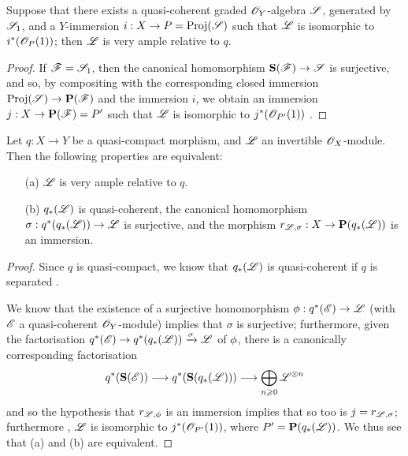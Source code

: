 \begin{corollary}[4.4.3]
\label{II.4.4.3}
Suppose that there exists a quasi-coherent graded $\mathscr{O}_Y$-algebra $\mathscr{S}$, generated by $\mathscr{S}_1$, and a $Y$-immersion $i:X\to P=\Proj(\sh{S})$ such that $\mathscr{L}$ is isomorphic to $i^*(\mathscr{O}_P(1))$;
then $\mathscr{L}$ is very ample relative to $q$.
\end{corollary}

\begin{proof}
If $\mathscr{F}=\mathscr{S}_1$, then the canonical homomorphism $\bb{S}(\sh{F})\to\sh{S}$ is surjective, and so, by compositing with the corresponding closed immersion $\Proj(\sh{S})\to\bb{P}(\sh{F})$  and the immersion $i$, we obtain an immersion $j:X\to\bb{P}(\sh{F})=P'$ such that $\mathscr{L}$ is isomorphic to $j^*(\mathscr{O}_{P'}(1))$ .
\end{proof}

\begin{proposition}[4.4.4]
\label{II.4.4.4}
Let $q:X\to Y$ be a quasi-compact morphism, and $\mathscr{L}$ an invertible $\mathscr{O}_X$-module.
Then the following properties are equivalent:
\begin{enumerate}
  \item[\rm{(a)}] $\mathscr{L}$ is very ample relative to $q$.
  \item[\rm{(b)}] $q_*(\mathscr{L})$ is quasi-coherent, the canonical homomorphism $\sigma:q^*(q_*(\sh{L}))\to\sh{L}$ is surjective, and the morphism $r_{\sh{L},\sigma}:X\to\bb{P}(q_*(\sh{L}))$ is an immersion.
\end{enumerate}
\end{proposition}

\begin{proof}
Since $q$ is quasi-compact, we know that $q_*(\mathscr{L})$ is quasi-coherent if $q$ is separated .

We know  that the existence of a surjective homomorphism $\vphi:q^*(\sh{E})\to\sh{L}$ (with $\mathscr{E}$ a quasi-coherent $\mathscr{O}_Y$-module) implies that $\sigma$ is surjective;
furthermore, given the factorisation $q^*(\sh{E})\to q^*(q_*(\sh{L}))\xrightarrow{\sigma}\sh{L}$ of $\phi$, there is a canonically corresponding factorisation
\[
  q^*(\bb{S}(\sh{E})) \to q^*(\bb{S}(q_*(\sh{L}))) \to \bigoplus_{n\geq0}\sh{L}^{\otimes n}
\]
and so  the hypothesis that $r_{\mathscr{L},\phi}$ is an immersion implies that so too is $j=r_{\mathscr{L},\sigma}$;
furthermore , $\mathscr{L}$ is isomorphic to $j^*(\mathscr{O}_{P'}(1))$, where $P'=\mathbf{P}(q_*(\mathscr{L}))$.
We thus see that (a) and (b) are equivalent.
\end{proof}

